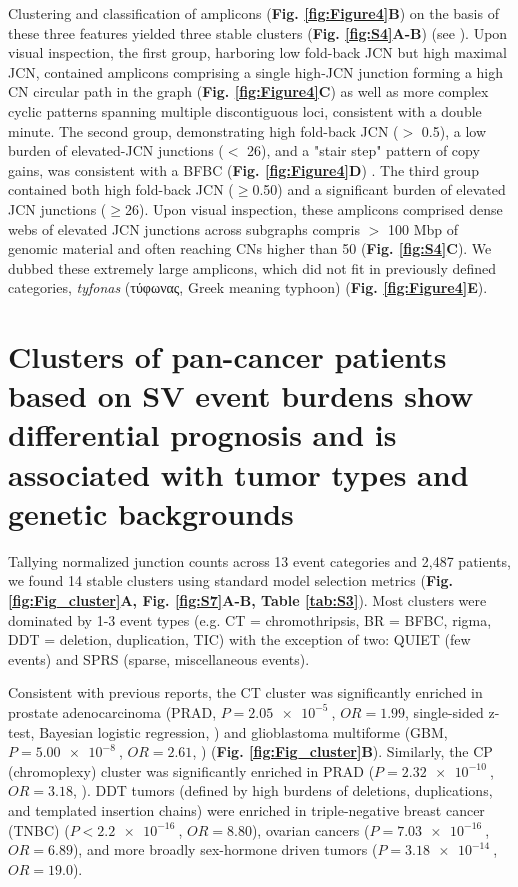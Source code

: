 \documentclass[phd,tocprelim]{cornell}
\begin{document}
Clustering and classification of amplicons (\textbf{Fig. \ref{fig:Figure4}B}) on the basis of these three features yielded three stable clusters (\textbf{Fig. \ref{fig:S4}A-B}) (see ).  Upon visual inspection, the first group, harboring low fold-back JCN but high maximal JCN, contained amplicons comprising a single high-JCN junction forming a high CN circular path in the graph (\textbf{Fig. \ref{fig:Figure4}C}) as well as more complex cyclic patterns spanning multiple discontiguous loci, consistent with a double minute.  The second group, demonstrating high fold-back JCN ($>$ 0.5), a low burden of elevated-JCN junctions ($<$ 26), and a "stair step" pattern of copy gains, was consistent with a BFBC (\textbf{Fig. \ref{fig:Figure4}D}) \cite{Zakov:2013cm}. The third group contained both high fold-back JCN ($\geq$0.50) and a significant burden of elevated JCN junctions ($\geq$26).  Upon visual inspection, these amplicons comprised dense webs of elevated  JCN junctions across subgraphs compris $>$ 100 Mbp of genomic material and often reaching CNs higher than 50 (\textbf{Fig. \ref{fig:S4}C}).  We dubbed these extremely large amplicons, which did not fit in previously defined categories, \textit{tyfonas} (τύφωνας, Greek meaning typhoon) (\textbf{Fig. \ref{fig:Figure4}E}).

\section{Clusters of pan-cancer patients based on SV event burdens show differential prognosis and is associated with tumor types and genetic backgrounds}
Tallying normalized junction counts across 13 event categories and 2,487 patients, we found 14 stable clusters using standard model selection metrics (\textbf{Fig. \ref{fig:Fig_cluster}A, Fig. \ref{fig:S7}A-B, Table \ref{tab:S3}}). Most clusters were dominated by 1-3 event types (e.g. CT = chromothripsis, BR = BFBC, rigma, DDT = deletion, duplication, TIC) with the exception of two: QUIET (few events) and SPRS (sparse, miscellaneous events).

Consistent with previous reports, the CT cluster was significantly enriched in prostate adenocarcinoma  (PRAD, $P = \SI{2.05e-5}{}$, $OR = 1.99$, single-sided z-test, Bayesian logistic regression, \cite{Kovtun2015-kq}) and glioblastoma multiforme (GBM, $P = \SI{5.00e-8}{}$, $OR = 2.61$, \cite{Furgason2015-rv})  (\textbf{Fig. \ref{fig:Fig_cluster}B}). Similarly, the CP (chromoplexy) cluster was significantly enriched in PRAD ($P = \SI{2.32e-10}{}$, $OR = 3.18$, \cite{baca2013}). DDT tumors (defined by high burdens of deletions, duplications, and templated insertion chains) were enriched in triple-negative breast cancer (TNBC) ($P < \SI{2.2e-16}{}$, $OR = 8.80$),  ovarian cancers ($P = \SI{7.03e-16}{}$, $OR = 6.89$), and more broadly sex-hormone driven tumors ($P = \SI{3.18e-14}{}$, $OR = 19.0$). 
\end{document}
